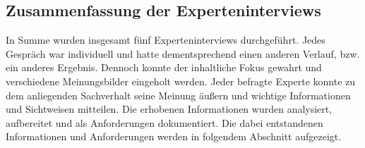 \subsection{Zusammenfassung der Experteninterviews}
    In Summe wurden insgesamt fünf Experteninterviews durchgeführt. Jedes Gespräch war individuell und hatte dementsprechend 
    einen anderen Verlauf, bzw. ein anderes Ergebnis. Dennoch konnte der inhaltliche Fokus gewahrt und verschiedene 
    Meinungsbilder eingeholt werden. Jeder befragte Experte konnte zu dem anliegenden Sachverhalt seine Meinung äußern und 
    wichtige Informationen und Sichtweisen mitteilen. Die erhobenen Informationen wurden analysiert, aufbereitet und 
    als Anforderungen dokumentiert. Die dabei entstandenen Informationen und Anforderungen werden in 
    folgendem Abschnitt aufgezeigt. 
    
\pagebreak

